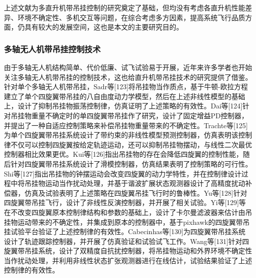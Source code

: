 上述文献为多直升机带吊挂控制的研究奠定了基础，但均没有考虑各直升机性能差异、环境不确定性、多机交互等问题，在综合考虑多方因素，提高系统飞行品质方面，仍具有较大的发展空间，这也是本文的主要研究目的。

\subsubsection{多轴无人机带吊挂控制技术}
由于多轴无人机结构简单、代价低廉、试飞试验易于开展，近年来许多学者也开始关注多轴无人机带吊挂的控制技术，这也给直升机带吊挂技术的研究提供了借鉴。针对单个多轴无人机带吊挂，Sadr等[123]将吊挂物当作质点，基于牛顿-欧拉方程建立了单个四旋翼带吊挂的八自由度动力学模型，然后在上述非线性模型的基础上，设计了抑制吊挂物振荡控制律，仿真证明了上述策略的有效性。Dai等[124]针对吊挂物重量不确定时的单四旋翼带吊挂作了研究，设计了固定增益PD控制器，并提出了一种自适应控制策略来补偿吊挂物重量带来的不确定性。Trachte等[125]为单个四旋翼带吊挂系统设计了带约束的非线性模型预测控制器，仿真表明该控制律不仅可以控制四旋翼按给定轨迹运动，还可以抑制吊挂物摆动，与线性二次最优控制器相比效果更优。Kui等[126]指出吊挂物的存在会降低四旋翼的控制性能，随后针对四旋翼带吊挂系统设计了滑模控制器，仿真结果表明了控制策略的可行性。Shi等[127]指出吊挂物的钟摆运动会改变四旋翼的动力学特性，并在控制律设计过程中将吊挂物运动当作扰动处理，并基于谐波扩展状态观测器设计了高精度扰动补偿器，仿真及试验表明了上述策略在四旋翼吊挂飞行时的鲁棒性。Yu等[128]针对四旋翼带吊挂飞行，设计了非线性反演控制器，并开展了相关试验。Yi等[129]等在不改变四旋翼原本控制律结构和参数的基础上，设计了卡尔曼滤波器来估计由吊挂物运动带来的不确定性，并集成到原本的控制器中，基于pixhawk的四旋翼带吊挂试验平台验证了上述控制律的有效性。Cabecinhas等[130]为四旋翼带吊挂系统设计了轨迹跟踪控制器，并开展了仿真验证和试验试飞工作。Wang等[131]针对四旋翼带吊挂系统，设计了双精度自抗扰控制器，将吊挂物运动和外界环境不确定性当作扰动处理，并利用非线性状态扩张观测器进行在线估计，试验结果验证了上述控制律的有效性。

